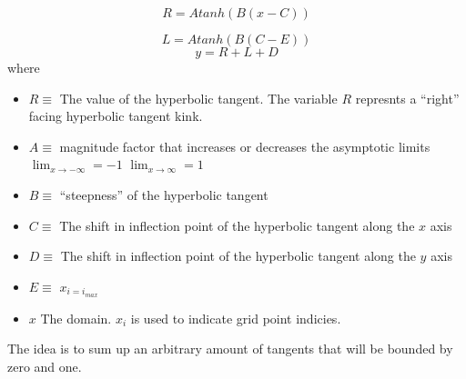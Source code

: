 \documentclass[a4paper]{article}
\begin{document}
\begin{equation}
    R = A tanh(B(x-C)) 
    \label{eqn:1}
\end{equation}

\begin{equation}
    L = A tanh(B(C-E)) 
    \label{eqn:2}
\end{equation}
\begin{equation}
    y = R + L + D
    \label{eqn:3}
\end{equation}
where 
\begin{itemize}
    \item $R \equiv$ The value of the hyperbolic tangent. The variable $R$ represnts
        a ``right'' facing hyperbolic tangent kink.
    \item $A \equiv$ magnitude factor that increases or decreases the asymptotic
        limits $\lim_{x \to -\infty} = -1$ $\lim_{x \to \infty} = 1$
    \item $B \equiv$ ``steepness'' of the hyperbolic tangent
    \item $C \equiv$ The shift in inflection point of the hyperbolic tangent along the $
        x$ axis 
    \item $D \equiv$ The shift in inflection point of the hyperbolic tangent along the $
        y$ axis 
    \item $E \equiv$  $x_{i=i_{max}}$
    \item $x$ The domain. $x_i$ is used to indicate grid point indicies.
\end{itemize}
The idea is to sum up an arbitrary amount of tangents that will be bounded by zero
and one. 

\begin{figure}
    \centering
\end{figure}
\end{document}
